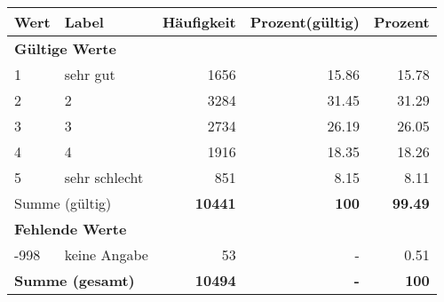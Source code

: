     \begin{longtable}{lXrrr}
     \toprule
     \textbf{Wert} & \textbf{Label} & \textbf{Häufigkeit} & \textbf{Prozent(gültig)} & \textbf{Prozent} \\
     \endhead
     \midrule
     \multicolumn{5}{l}{\textbf{Gültige Werte}}\\

     1 &
     \multicolumn{1}{X}{ sehr gut   } &


       \num{1656} &
       \num[round-mode=places,round-precision=2]{15,86} &
         \num[round-mode=places,round-precision=2]{15,78} \\

     2 &
     \multicolumn{1}{X}{ 2   } &


       \num{3284} &
       \num[round-mode=places,round-precision=2]{31,45} &
         \num[round-mode=places,round-precision=2]{31,29} \\

     3 &
     \multicolumn{1}{X}{ 3   } &


       \num{2734} &
       \num[round-mode=places,round-precision=2]{26,19} &
         \num[round-mode=places,round-precision=2]{26,05} \\

     4 &
     \multicolumn{1}{X}{ 4   } &


       \num{1916} &
       \num[round-mode=places,round-precision=2]{18,35} &
         \num[round-mode=places,round-precision=2]{18,26} \\

     5 &
     \multicolumn{1}{X}{ sehr schlecht   } &


       \num{851} &
       \num[round-mode=places,round-precision=2]{8,15} &
         \num[round-mode=places,round-precision=2]{8,11} \\
     \midrule
     \multicolumn{2}{l}{Summe (gültig)} &
       \textbf{\num{10441}} &
     \textbf{100} &
       \textbf{\num[round-mode=places,round-precision=2]{99,49}} \\
     \multicolumn{5}{l}{\textbf{Fehlende Werte}}\\
       -998 &
       keine Angabe &
         \num{53} &
        - &
         \num[round-mode=places,round-precision=2]{0,51} \\
     \midrule
     \multicolumn{2}{l}{\textbf{Summe (gesamt)}} &
          \textbf{\num{10494}} &
        \textbf{-} &
        \textbf{100} \\
     \bottomrule
     \end{longtable}
     
